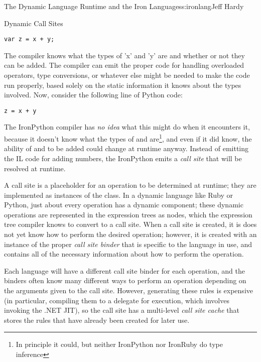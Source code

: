 \begin{aosachapter}{The Dynamic Language Runtime and the Iron Languages}{s:ironlang}{Jeff Hardy}
\begin{aosasect1}{Dynamic Call Sites}
\begin{verbatim}
var z = x + y;
\end{verbatim}

The compiler knows what the types of 'x' and 'y' are and whether or not they can be added. The compiler can emit the proper code for handling overloaded operators, type conversions, or whatever else might be needed to make the code run properly, based solely on the static information it knows about the types involved. Now, consider the following line of Python code:

\begin{verbatim}
z = x + y
\end{verbatim}

The IronPython compiler has \emph{no idea} what this might do when it encounters it, because it doesn't know what the types of  and  are\footnote{In principle it could, but neither IronPython nor IronRuby do type inference}, and even if it did know, the ability of  and  to be added could change at runtime anyway. Instead of emitting the IL code for adding numbers, the IronPython emits a \emph{call site} that will be resolved at runtime.

A call site is a placeholder for an operation to be determined at runtime; they are implemented as instances of the  class. In a dynamic language like Ruby or Python, just about every operation has a dynamic component; these dynamic operations are represented in the expression trees as  nodes, which the expression tree compiler knows to convert to a call site. When a call site is created, it is does not yet know how to perform the desired operation; however, it is created with an instance of the proper \emph{call site binder} that is specific to the language in use, and contains all of the necessary information about how to perform the operation.


Each language will have a different call site binder for each operation, and the binders often know many different ways to perform an operation depending on the arguments given to the call site. However, generating these rules is expensive (in particular, compiling them to a delegate for execution, which involves invoking the .NET JIT), so the call site has a multi-level \emph{call site cache} that stores the rules that have already been created for later use.


\end{aosasect1}
\end{aosachapter}
